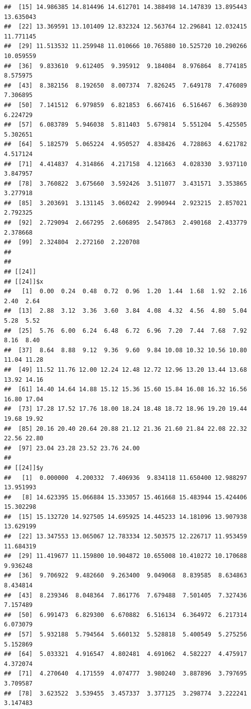 \documentclass[
  ignorenonframetext,
]{beamer}
\begin{document}
\begin{frame}[fragile]{}
\begin{verbatim}
##  [15] 14.986385 14.814496 14.612701 14.388498 14.147839 13.895443 13.635043
##  [22] 13.369591 13.101409 12.832324 12.563764 12.296841 12.032415 11.771145
##  [29] 11.513532 11.259948 11.010666 10.765880 10.525720 10.290266 10.059559
##  [36]  9.833610  9.612405  9.395912  9.184084  8.976864  8.774185  8.575975
##  [43]  8.382156  8.192650  8.007374  7.826245  7.649178  7.476089  7.306895
##  [50]  7.141512  6.979859  6.821853  6.667416  6.516467  6.368930  6.224729
##  [57]  6.083789  5.946038  5.811403  5.679814  5.551204  5.425505  5.302651
##  [64]  5.182579  5.065224  4.950527  4.838426  4.728863  4.621782  4.517124
##  [71]  4.414837  4.314866  4.217158  4.121663  4.028330  3.937110  3.847957
##  [78]  3.760822  3.675660  3.592426  3.511077  3.431571  3.353865  3.277918
##  [85]  3.203691  3.131145  3.060242  2.990944  2.923215  2.857021  2.792325
##  [92]  2.729094  2.667295  2.606895  2.547863  2.490168  2.433779  2.378668
##  [99]  2.324804  2.272160  2.220708
## 
## 
## [[24]]
## [[24]]$x
##   [1]  0.00  0.24  0.48  0.72  0.96  1.20  1.44  1.68  1.92  2.16  2.40  2.64
##  [13]  2.88  3.12  3.36  3.60  3.84  4.08  4.32  4.56  4.80  5.04  5.28  5.52
##  [25]  5.76  6.00  6.24  6.48  6.72  6.96  7.20  7.44  7.68  7.92  8.16  8.40
##  [37]  8.64  8.88  9.12  9.36  9.60  9.84 10.08 10.32 10.56 10.80 11.04 11.28
##  [49] 11.52 11.76 12.00 12.24 12.48 12.72 12.96 13.20 13.44 13.68 13.92 14.16
##  [61] 14.40 14.64 14.88 15.12 15.36 15.60 15.84 16.08 16.32 16.56 16.80 17.04
##  [73] 17.28 17.52 17.76 18.00 18.24 18.48 18.72 18.96 19.20 19.44 19.68 19.92
##  [85] 20.16 20.40 20.64 20.88 21.12 21.36 21.60 21.84 22.08 22.32 22.56 22.80
##  [97] 23.04 23.28 23.52 23.76 24.00
## 
## [[24]]$y
##   [1]  0.000000  4.200332  7.406936  9.834118 11.650400 12.988297 13.951993
##   [8] 14.623395 15.066884 15.333057 15.461668 15.483944 15.424406 15.302298
##  [15] 15.132720 14.927505 14.695925 14.445233 14.181096 13.907938 13.629199
##  [22] 13.347553 13.065067 12.783334 12.503575 12.226717 11.953459 11.684319
##  [29] 11.419677 11.159800 10.904872 10.655008 10.410272 10.170688  9.936248
##  [36]  9.706922  9.482660  9.263400  9.049068  8.839585  8.634863  8.434814
##  [43]  8.239346  8.048364  7.861776  7.679488  7.501405  7.327436  7.157489
##  [50]  6.991473  6.829300  6.670882  6.516134  6.364972  6.217314  6.073079
##  [57]  5.932188  5.794564  5.660132  5.528818  5.400549  5.275256  5.152869
##  [64]  5.033321  4.916547  4.802481  4.691062  4.582227  4.475917  4.372074
##  [71]  4.270640  4.171559  4.074777  3.980240  3.887896  3.797695  3.709587
##  [78]  3.623522  3.539455  3.457337  3.377125  3.298774  3.222241  3.147483

\end{verbatim}
\end{frame}
\end{document}
